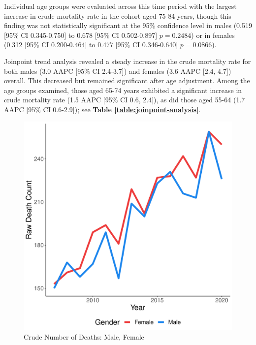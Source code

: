 \documentclass[12pt]{article}
\begin{document}
\par \bigskip

\noindent Individual age groups were evaluated across this time period with the largest increase in crude mortality rate in the cohort aged 75-84 years, though this finding was not statistically significant at the 95\% confidence level in males (0.519 [95\% CI 0.345-0.750] to 0.678 [95\% CI 0.502-0.897] $p = 0.2484$) or in females (0.312 [95\% CI 0.200-0.464] to 0.477 [95\% CI 0.346-0.640] $p = 0.0866$).

\par \bigskip

\noindent Joinpoint trend analysis revealed a steady increase in the crude mortality rate for both males (3.0 AAPC [95\% CI 2.4-3.7]) and females (3.6 AAPC [2.4, 4.7]) overall. This decreased but remained significant after age adjustment. Among the age groups examined, those aged 65-74 years exhibited a significant increase in crude mortality rate (1.5 AAPC [95\% CI 0.6, 2.4]), as did those aged 55-64 (1.7 AAPC [95\% CI 0.6-2.9]); see \textbf{Table \ref{table:joinpoint-analysis}}.


\newpage

\begin{figure}
    \centering
    \includegraphics[scale=0.5]{analysis/output/raw_deaths_by_gender_plot.pdf}
    \caption{Crude Number of Deaths: Male, Female}
    \label{fig:crude_deaths_by_gender}
\end{figure}
\end{document}

